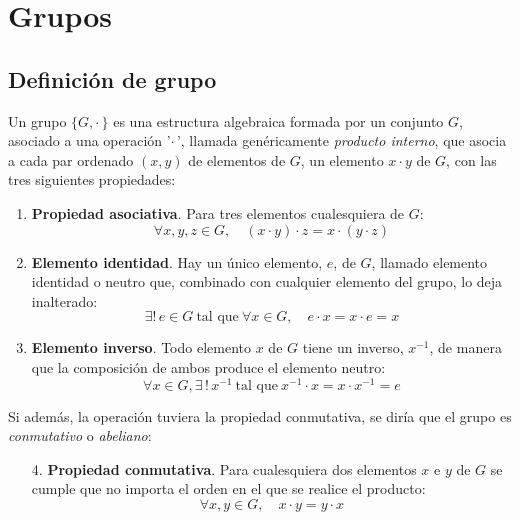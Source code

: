 %
%

\chapter{Grupos}

\section{Definición de grupo}
Un grupo $\{G,\cdot\,\}$ es una estructura algebraica formada por un
conjunto $G$, asociado a una operación '$\cdot\,$', llamada
genéricamente \emph{producto interno}, que asocia a cada par ordenado
$(x,y)$ de elementos de $G$, un elemento $x\cdot y$ de $G$, con las
tres siguientes propiedades:
\begin{enumerate}
\item \textbf{Propiedad asociativa}. Para tres elementos cualesquiera de $G$:
  \begin{equation}\label{eq:gru-asociativa}
    \forall x, y, z \in G, \quad (x \cdot y) \cdot z = x \cdot (y \cdot z)
  \end{equation}
\item \textbf{Elemento identidad}. Hay un único elemento, $e$, de $G$, llamado
  elemento identidad o neutro que, combinado con cualquier elemento del grupo,
  lo deja inalterado:
  \begin{equation}\label{eq:gru-identidad}
    \exists !\, e \in G \ \text{tal que}\ \forall x \in G, \quad e \cdot x
    = x \cdot e = x
  \end{equation}
\item \textbf{Elemento inverso}. Todo elemento $x$ de $G$ tiene un
  inverso\footnotemark, $x^{-1}$, de manera que la composición de ambos
  produce el elemento neutro: 
  \begin{equation}\label{eq:gru-inverso}
    \forall x \in G, \exists\, !\, x^{-1} \
    \text{tal que}\ x^{-1} \cdot x = x \cdot  x^{-1} = e
  \end{equation}
\end{enumerate}

Si además, la operación tuviera la propiedad conmutativa, se diría que
el grupo es \emph{conmutativo} o \emph{abeliano}:
\begin{enumerate}
\item[4.] \textbf{Propiedad conmutativa}. Para cualesquiera dos
  elementos $x$ e $y$ de $G$ se cumple que no importa el orden en el
  que se realice el producto:
  \begin{equation}\label{eq:gru-conmutativa}
    \forall x,y \in G, \quad x \cdot y = y \cdot x
  \end{equation}
\end{enumerate}



 

